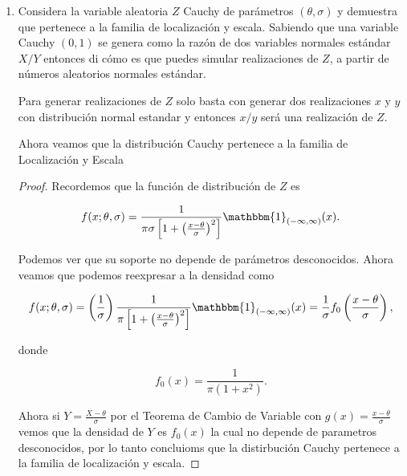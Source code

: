 \documentclass[letterpaper]{article}
\theoremstyle{definition}
\theoremstyle{lemathm}
\theoremstyle{lemathm}
\theoremstyle{lemathm}
\theoremstyle{lemademthm}
\newcommand{\pars}[1]{\left( #1 \right) }
\newcommand{\bracs}[1]{\left[ #1 \right] }
\newcommand{\1}{\mathbbm{1}}
\begin{document}
\begin{enumerate}
		\item Considera la variable aleatoria $Z$ Cauchy de parámetros $\pars{\theta, \sigma}$ y demuestra que pertenece a la familia de localización y escala. Sabiendo que una variable Cauchy $\pars{0,1}$ se genera como la razón de dos variables normales estándar $X/Y$ entonces di cómo es que puedes simular realizaciones de $Z$, a partir de números aleatorios normales estándar.
		
		Para generar realizaciones de $Z$ solo basta con generar dos realizaciones $x$ y $y$ con distribución normal estandar y entonces $x/y$ será una realización de $Z$.

		Ahora veamos que la distribución Cauchy pertenece a la familia de Localización y Escala

		\begin{proof}
			Recordemos que la función de distribución de $Z$ es
			
			\[f(x;\theta,\sigma) = \frac{1}{\pi\sigma\bracs{1+\pars{\frac{x-\theta}{\sigma}}^2}}\1_{\pars{-\infty,\infty}}(x).\]

			Podemos ver que su soporte no depende de parámetros desconocidos. Ahora veamos que podemos reexpresar a la densidad como

			\[f(x;\theta,\sigma) = \pars{\frac{1}{\sigma}}\frac{1}{\pi\bracs{1+\pars{\frac{x-\theta}{\sigma}}^2}}\1_{\pars{-\infty,\infty}}(x) = \frac{1}{\sigma}f_0\pars{\frac{x-\theta}{\sigma}},\]

			donde

			\[f_0(x) = \frac{1}{\pi\pars{1 + x^2}}.\]

			Ahora si $Y = \frac{X-\theta}{\sigma}$ por el Teorema de Cambio de Variable con $g(x) = \frac{x-\theta}{\sigma}$ vemos que la densidad de $Y$ es $f_0(x)$ la cual no depende de parametros desconocidos, por lo tanto concluioms que la distirbución Cauchy pertenece a la familia de localización y escala.
		\end{proof}

    \end{enumerate}

	
\end{document}
